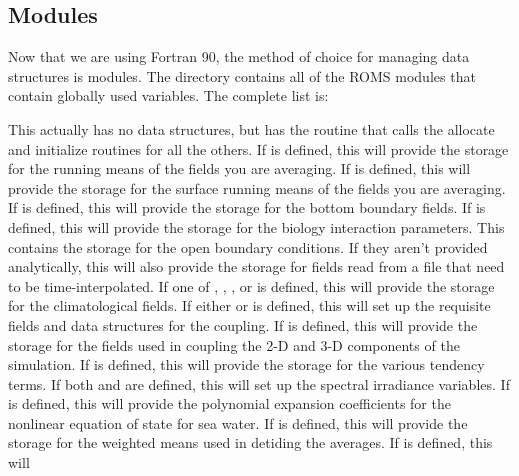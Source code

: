 \subsection{Modules}
\label{Mod_f90}
Now that we are using Fortran 90, the method of choice for managing
data structures is modules. The  directory
contains all of the ROMS modules that contain globally used
variables. The complete list is:
\begin{klist}
   This actually has no data structures, but has the
    routine that calls the allocate and initialize routines for all the
    others.
   If  is defined, this will
    provide the storage for the running means of the fields you are averaging.
   If  is defined, this will
    provide the storage for the surface running means of the fields you are
    averaging.
    If  is defined, this will
    provide the storage for the bottom boundary fields.
    If  is defined, this will
    provide the storage for the biology interaction parameters.
   This contains the storage for the open boundary
    conditions. If they aren't provided analytically, this will also provide
    the storage for fields read from a file that need to be time-interpolated.
    If one of , ,
    , or  is defined, this will
    provide the storage for the climatological fields.
    If either   or
     is defined, this will set up the requisite fields and
    data structures for the coupling.
    If  is defined, this will
    provide the storage for the fields used in coupling the 2-D
    and 3-D components of the simulation.
    If  is defined, this will
    provide the storage for the various tendency terms.
    If both  and 
    are defined, this will set up the spectral irradiance
    variables.
    If  is defined, this will
    provide the polynomial expansion coefficients for the nonlinear equation
    of state for sea water.
   If  is defined, this will provide
    the storage for the weighted means used in detiding the averages.
   If  is defined, this will

\end{klist}
